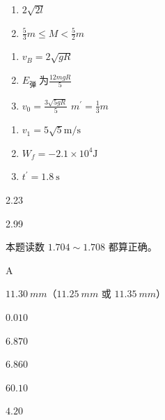 \item \begin {enumerate} \renewcommand {\labelenumi }{\arabic {enumi}.} \item $2 \sqrt {2 l}$ \item $\frac {5}{3} m \leq M<\frac {5}{2} m$ \par \par \par \end {enumerate} \par \par 
\item \begin {enumerate} \renewcommand {\labelenumi }{\arabic {enumi}.} \item $v_{B}=2 \sqrt {g R}$ \par \item $E_{\text {弹 }} \text {为} \frac {12 m g R}{5}$ \item $v_{0}=\frac {3 \sqrt {5 g R}}{5}$ \qquad $m^{\prime }=\frac {1}{3} m$ \end {enumerate} \par \par 
\item \begin {enumerate} \renewcommand {\labelenumi }{\arabic {enumi}.} \item $v_{1}=5 \sqrt {5} \mathrm {m} / \mathrm {s}$ \item $W_{f}=-2.1 \times 10^{4} \mathrm {J}$ \item $t^{\prime }=1.8 \ \mathrm {s}$ \par \par \par \end {enumerate} \par \par 
\item 2.23
\item 2.99
\item 本题读数 $ 1.704 \sim 1.708 $ 都算正确。
\item A
\item $ 11.30 \ mm $（$ 11.25 \ mm $ 或 $ 11.35 \ mm $）
\item $ 0.010 $
\item $ 6.870 $
\item $ 6.860 $
\item \par 
\item $ 60.10 $
\item $ 4.20 $
